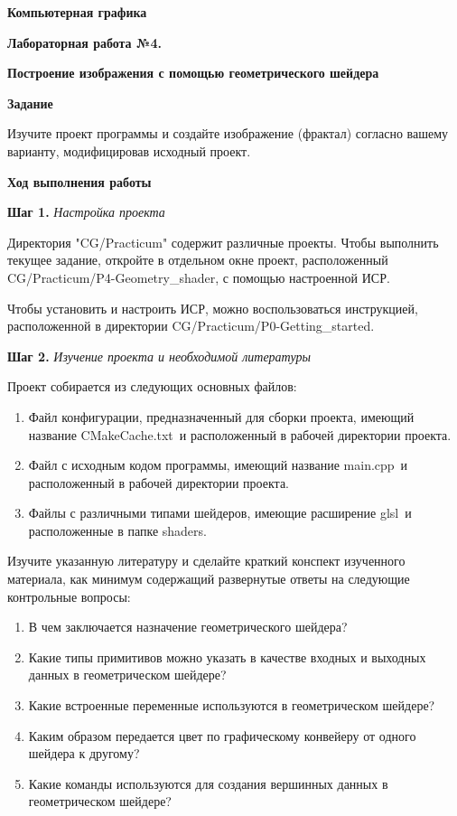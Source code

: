 \documentclass[a4paper,12pt]{article}
\begin{document}
\fontsize{14pt}{16pt}\selectfont
\begin{center}
    \textbf{{\Large Компьютерная графика}}
    
    \textbf{{\large Лабораторная работа №4. }}
    
    \textbf{{\large Построение изображения с помощью геометрического шейдера}}
    \end{center}
    
    
    \textbf{Задание}
    
    Изучите проект программы и создайте изображение (фрактал) согласно вашему варианту, модифицировав исходный проект.
    
    \textbf{Ход выполнения работы}
    
    \textbf{Шаг 1.} \textit{Настройка проекта}
    
    Директория "CG/Practicum" содержит различные проекты. Чтобы выполнить текущее задание, откройте в отдельном окне проект, расположенный \textquotedbl CG/Practicum/P4-Geometry\_shader\textquotedbl, с помощью настроенной ИСР.

    Чтобы установить и настроить ИСР, можно воспользоваться инструкцией, расположенной в директории 
    \textquotedbl CG/Practicum/P0-Getting\_started\textquotedbl .
    
    \textbf{Шаг 2.} \textit{Изучение проекта и необходимой литературы}
    
    Проект собирается из следующих основных файлов:
    
    \begin{enumerate}
        \item Файл конфигурации, предназначенный для сборки проекта, имеющий название \textquotedbl CMakeCache.txt\textquotedbl~и расположенный в рабочей директории проекта.
        \item Файл с исходным кодом программы, имеющий название \textquotedbl main.cpp\textquotedbl~и расположенный в рабочей директории проекта.
        \item Файлы с различными типами шейдеров, имеющие расширение \textquotedbl glsl\textquotedbl~и расположенные в папке \textquotedbl shaders\textquotedbl.
    \end{enumerate}
    
    Изучите указанную литературу и сделайте краткий конспект изученного материала, как минимум содержащий развернутые ответы на следующие контрольные вопросы:

    \begin{enumerate}
        \item 
        В чем заключается назначение геометрического шейдера?
        \item 
        Какие типы примитивов можно указать в качестве входных и выходных данных в геометрическом шейдере?
        \item 
        Какие встроенные переменные используются в геометрическом шейдере?
        \item 
        Каким образом передается цвет по графическому конвейеру от одного шейдера к другому?
        \item 
        Какие команды используются для создания вершинных данных в геометрическом шейдере?
    \end{enumerate}
\end{document}
